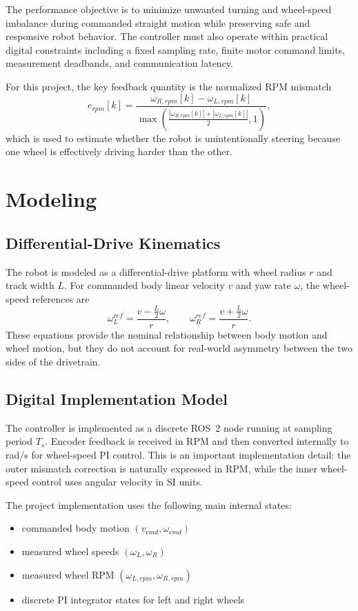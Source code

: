 \documentclass[conference]{IEEEtran}
\begin{document}
The performance objective is to minimize unwanted turning and wheel-speed imbalance during commanded straight motion while preserving safe and responsive robot behavior. The controller must also operate within practical digital constraints including a fixed sampling rate, finite motor command limits, measurement deadbands, and communication latency.

For this project, the key feedback quantity is the normalized RPM mismatch
\begin{equation}
e_{rpm}[k] =
\frac{\omega_{R,rpm}[k]-\omega_{L,rpm}[k]}
{\max\left(\frac{|\omega_{R,rpm}[k]|+|\omega_{L,rpm}[k]|}{2},1\right)},
\label{eq:rpm_error}
\end{equation}
which is used to estimate whether the robot is unintentionally steering because one wheel is effectively driving harder than the other.

\section{Modeling}
\subsection{Differential-Drive Kinematics}
The robot is modeled as a differential-drive platform with wheel radius $r$ and track width $L$. For commanded body linear velocity $v$ and yaw rate $\omega$, the wheel-speed references are
\begin{equation}
\omega_L^{ref} = \frac{v-\frac{L}{2}\omega}{r},
\qquad
\omega_R^{ref} = \frac{v+\frac{L}{2}\omega}{r}.
\label{eq:diffdrive}
\end{equation}
These equations provide the nominal relationship between body motion and wheel motion, but they do not account for real-world asymmetry between the two sides of the drivetrain.

\subsection{Digital Implementation Model}
The controller is implemented as a discrete ROS~2 node running at sampling period $T_s$. Encoder feedback is received in RPM and then converted internally to rad/s for wheel-speed PI control. This is an important implementation detail: the outer mismatch correction is naturally expressed in RPM, while the inner wheel-speed control uses angular velocity in SI units.

The project implementation uses the following main internal states:
\begin{itemize}
\item commanded body motion $(v_{cmd}, \omega_{cmd})$
\item measured wheel speeds $(\omega_L,\omega_R)$
\item measured wheel RPM $(\omega_{L,rpm}, \omega_{R,rpm})$
\item discrete PI integrator states for left and right wheels
\end{itemize}
\end{document}
